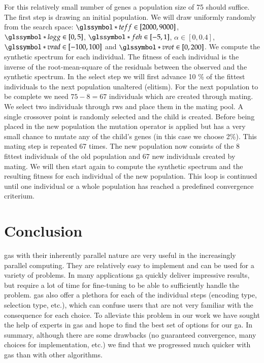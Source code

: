 For this relatively small number of genes a population size of 75 should suffice. The first step is drawing an initial population. We will draw uniformly randomly from the search space: $\teff \in [2000, 9000]$, $\logg \in [0, 5]$, $\feh \in [-5,1]$, $\alpha \in [0,0.4]$, $\vrad \in [-100, 100]$ and $\vrot \in [0,200]$. We compute the synthetic spectrum for each individual. The fitness of each individual is the inverse of the root-mean-square of the residuals between the observed and the synthetic spectrum. 
In the select step we will first advance 10 \% of the fittest individuals to the next population unaltered (\gls{elitism}). For the next population to be complete we need $75 - 8 = 67$ individuals which are created through mating. We select two individuals through \gls{rws} and place them in the mating pool. A single crossover point is randomly selected and the child is created. Before being placed in the new population the mutation operator is applied but has a very small chance to mutate any of the child's genes (in this case we choose 2\%).
This mating step is repeated 67 times. The new population now consists of the 8 fittest individuals of the old population and 67 new individuals created by mating. We will then start again to compute the synthetic spectrum and the resulting fitness for each individual of the new population. This loop is continued until one individual or a whole population has reached a predefined convergence criterium.

\section{Conclusion}

\glspl{ga} with their inherently parallel nature are very useful in the increasingly parallel computing. They are relatively easy to implement and can be used for a variety of problems. In many applications \gls{ga} quickly deliver impressive results, but require a lot of time for fine-tuning to be able to sufficiently handle the problem. \glspl{ga} also offer a plethora for each of the individual steps (encoding type, selection type, etc.), which can confuse users that are not very familiar with the consequence for each choice. To alleviate this problem in our work we have sought the help of experts in \glspl{ga} and hope to find the best set of options for our \gls{ga}. 
In summary, although there are some drawbacks (no guaranteed convergence, many choices for implementation, etc.) we find that we progressed much quicker with \glspl{ga} than with other algorithms. 


